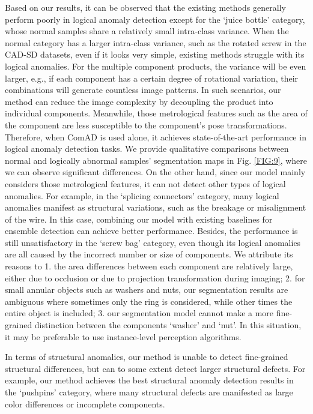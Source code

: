 \documentclass[final,5p,times,twocolumn]{elsarticle}
\begin{document}
Based on our results, it can be observed that the existing methods generally perform poorly in logical anomaly detection except for the `juice bottle' category, whose normal samples share a relatively small intra-class variance. When the normal category has a larger intra-class variance, such as the rotated screw in the CAD-SD datasets, even if it looks very simple, existing methods struggle with its logical anomalies. For the multiple component products, the variance will be even larger, e.g., if each component has a certain degree of rotational variation, their combinations will generate countless image patterns. In such scenarios, our method can reduce the image complexity by decoupling the product into individual components. Meanwhile, those metrological features such as the area of the component are less susceptible to the component's pose transformations. Therefore, when ComAD is used alone, it achieves state-of-the-art performance in logical anomaly detection tasks. We provide qualitative comparisons between normal and logically abnormal samples' segmentation maps in Fig. \ref{FIG:9}, where we can observe significant differences. On the other hand, since our model mainly considers those metrological features, it can not detect other types of logical anomalies. For example, in the `splicing connectors' category, many logical anomalies manifest as structural variations, such as the breakage or misalignment of the wire. In this case, combining our model with existing baselines for ensemble detection can achieve better performance. Besides, the performance is still unsatisfactory in the `screw bag' category, even though its logical anomalies are all caused by the incorrect number or size of components. We attribute its reasons to 1. the area differences between each component are relatively large, either due to occlusion or due to projection transformation during imaging; 2. for small annular objects such as washers and nuts, our segmentation results are ambiguous where sometimes only the ring is considered, while other times the entire object is included; 3. our segmentation model cannot make a more fine-grained distinction between the components `washer' and `nut'. In this situation, it may be preferable to use instance-level perception algorithms.   
   
In terms of structural anomalies, our method is unable to detect fine-grained structural differences, but can to some extent detect larger structural defects. For example, our method achieves the best structural anomaly detection results in the `pushpins' category, where many structural defects are manifested as large color differences or incomplete components.
\end{document}
